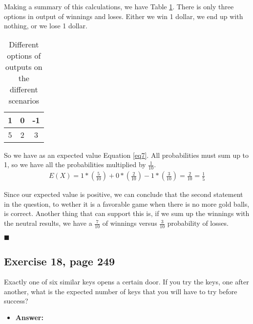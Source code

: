 \documentclass{article}
\begin{document}
Making a summary of this calculations, we have Table \ref{tab4}. There is only three options in output of winnings and loses. Either we win 1 dollar, we end up with nothing, or we lose 1 dollar.\\

 \begin{table}[]\caption{Different options of outputs on the different scenarios}\label{tab4}
\centering
\begin{tabular}{| c | c | c | }
\hline
1 &0 & -1 \\
\hline
5 & 2 & 3 \\
\hline
\end{tabular}
\end{table}

So we have as an expected value Equation \ref{eq7}. All probabilities must sum up to 1, so we have all the probabilities multiplied by $\frac{1}{10}$. \\

 \begin{eqnarray}
\label{eq7}
E(X) = 1* \left(\frac{5}{10}\right) + 0* \left(\frac{2}{10}\right) - 1* \left(\frac{3}{10}\right) = \frac{2}{10} = \frac{1}{5}
\end{eqnarray}

Since our expected value is positive, we can conclude that the second statement in the question, to wether it is a favorable game when there is no more gold balls, is correct. Another thing that can support this is, if we sum up the winnings with the neutral results, we have a $\frac{7}{10}$ of winnings versus $\frac{3}{10}$ probability of losses.\\

\begin{flushright}
$\blacksquare$
\end{flushright}

\subsection{Exercise 18, page 249}

Exactly one of six similar keys opens a certain door. If you try the keys, one after another, what is the expected number of keys that you will have to try before success?\\

\begin{itemize}
\item \textbf{Answer:}
\end{itemize}
\end{document}
